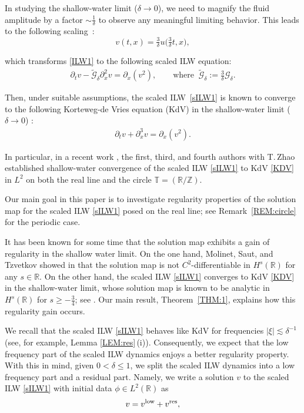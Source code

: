 \documentclass[letterpaper, 11pt,  reqno]{amsart}
\newcommand{\1}{\hspace{0.5mm}\textup{I}\hspace{0.5mm}}
\newcommand{\noi}{\noindent}
\newcommand{\Z}{\mathbb{Z}}
\newcommand{\R}{\mathbb{R}}
\newcommand{\T}{\mathbb{T}}
\newcommand{\low}{\textup{low}}
\newcommand{\high}{\textup{res}}
\newcommand{\dl}{\delta}
\newcommand{\wt}{\widetilde}
\newcommand{\dx}{\partial_x}
\newcommand{\dt}{\partial_t}
\newcommand{\Gdl}{\mathcal{G}_{\dl} }
\newcommand{\Gd}{\wt{\mathcal{G}}_\dl}
\newcommand{\les}{\lesssim}
\newcommand{\M}{\mathcal{M}}
\numberwithin{equation}{section}
\numberwithin{theorem}{section}
\begin{document}
In studying
 the shallow-water limit ($\dl\to0$), 
we need to magnify the fluid amplitude  by a factor $\sim \frac 1\dl$
 to observe any meaningful limiting behavior.
This leads to  the following scaling~\cite{ABFS}:
\begin{equation*}
v(t,x)  = \tfrac3\dl u\big(\tfrac3\dl t, x\big),
\end{equation*}



\noi
which transforms \eqref{ILW1} to  the following scaled ILW equation:
\begin{align}
\dt v   -    \Gd   \dx^2 v= \dx(v^2), 
\qquad \text{where }\ \Gd := \frac3\dl \Gdl.
\label{sILW1}
\end{align}

\noi
Then, under suitable assumptions, 
the scaled ILW~\eqref{sILW1} is known to  converge to the 
following 
Korteweg-de Vries equation (KdV)
in the shallow-water limit ($\dl\to 0$)
\cite{ABFS, Li24, LOZ, CLOZ}:
\begin{align}
\dt v + \dx^3 v = \dx(v^2) . 
\label{KDV}
\end{align}

\noi
In particular, in a recent work \cite{CLOZ}, 
the first, third, and fourth authors with T.\,Zhao
established shallow-water convergence
of the scaled ILW \eqref{sILW1}
to KdV \eqref{KDV} in $L^2$
on both the real line and the circle $\T = (\R/\Z)$.






\medskip




Our main goal in this paper is
to investigate regularity properties
of the solution map for the scaled ILW \eqref{sILW1}
posed on the real line; see Remark~\ref{REM:circle}
for the periodic case.

It has been known for some time that the solution map exhibits a gain of regularity in the shallow water limit.
On the one hand, Molinet, Saut, and Tzvetkov showed in \cite{MST}
that the solution map 
is not $C^2$-differentiable in $H^s(\R)$
for any $s \in \R$.
On the other hand, 
 the scaled ILW \eqref{sILW1}
 converges 
to KdV \eqref{KDV} in the shallow-water limit,
whose solution map is known to be analytic
in $H^s(\R)$ for $s \ge - \frac 34$; see \cite{BO93, KPV96, Kishi, Guo}.
Our main result, Theorem~\ref{THM:1}, explains how this regularity gain occurs.

We recall that the scaled ILW \eqref{sILW1}
behaves like KdV 
for frequencies $|\xi|\les \dl^{-1}$
(see, for example, Lemma \ref{LEM:res}\,(i)). 
Consequently, we expect that 
the low frequency part of the scaled ILW dynamics
enjoys a better regularity property.
With this in mind, given $0 < \dl \le1$,
we  split the scaled ILW dynamics
into a low frequency part
and a residual part.
Namely, we write a solution $v$ to the scaled ILW \eqref{sILW1}
with initial data $\phi \in L^2(\R)$
as
\begin{align}
v = v^\low + v^\high, 
\label{sILW1a}
\end{align}
\end{document}
